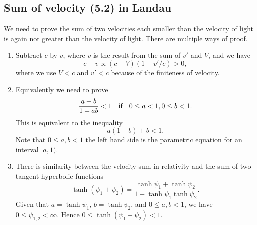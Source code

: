 \documentclass[10pt]{article}
\begin{document}
\subsection{Sum of velocity (5.2) in Landau}
We need to prove the sum of two velocities each smaller than the velocity of light is again not greater than the velocity of light. There are multiple ways of proof.
\begin{enumerate}
	\item Subtract $c$ by $v$, where $v$ is the result from the sum of $v'$ and $V$, and we have
	\begin{equation}
		c - v \propto (c-V)(1-v'/c) >0,
	\end{equation}
	where we use $V<c$ and $v'<c$ because of the finiteness of velocity.
	\item Equivalently we need to prove
	\begin{equation}
		\frac{a+b}{1+ab} <1\qif 0 \le a<1, 0 \le b<1.
	\end{equation}
	This is equivalent to the inequality
	\begin{equation}
		a(1-b) + b <1.
	\end{equation}
	Note that $0 \le a, b<1$ the left hand side is the parametric equation for an interval $[a,1)$.
	\item There is similarity between the velocity sum in relativity and the sum of two tangent hyperbolic functions
	\begin{equation}
		\tanh{(\psi_1 + \psi_2)} = \frac{\tanh{\psi_1} + \tanh{\psi_2}}{1 + \tanh{\psi_1} \tanh{\psi_2}}.
	\end{equation}
	Given that $a = \tanh{\psi_1}$, $b = \tanh{\psi_2}$, and $0 \le a,b <1$, we have $0 \le \psi_{1,2} < \infty$. Hence $0 \le \tanh{(\psi_1 + \psi_2)} <1$.
	\end{enumerate}
\end{document}
